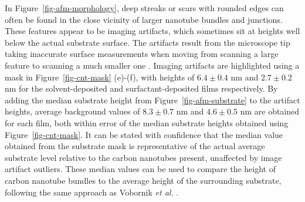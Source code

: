 \documentclass[
  a4paper,
]{scrbook}
\begin{document}
In Figure~\ref{fig-afm-morphology}, deep streaks or scars with rounded
edges can often be found in the close vicinity of larger nanotube
bundles and junctions. These features appear to be imaging artifacts,
which sometimes sit at heights well below the actual substrate surface.
The artifacts result from the microscope tip taking inaccurate surface
measurements when moving from scanning a large feature to scanning a
much smaller one \autocite{Ukraintsev2012}. Imaging artifacts are
highlighted using a mask in Figure~\ref{fig-cnt-mask} (e)-(f), with
heights of \(6.4 \pm 0.4\) nm and \(2.7 \pm 0.2\) nm for the
solvent-deposited and surfactant-deposited films respectively. By adding
the median substrate height from Figure~\ref{fig-afm-substrate} to the
artifact heights, average background values of \(8.3 \pm 0.7\) nm and
\(4.6 \pm 0.5\) nm are obtained for each film, both within error of the
median substrate heights obtained using Figure~\ref{fig-cnt-mask}. It
can be stated with confidence that the median value obtained from the
substrate mask is representative of the actual average substrate level
relative to the carbon nanotubes present, unaffected by image artifact
outliers. These median values can be used to compare the height of
carbon nanotube bundles to the average height of the surrounding
substrate, following the same approach as Vobornik \emph{et al.}
\autocite{Vobornik2023}.
\end{document}
